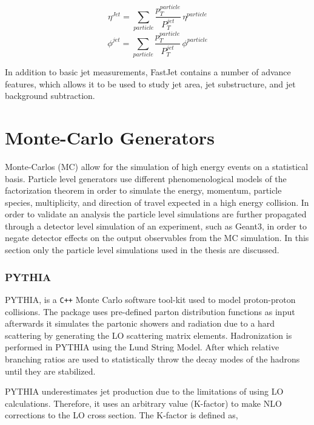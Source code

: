 \begin{equation}
\eta^{Jet} = \sum_{particle} \frac{p_{T}^{particle}}{P_{T}^{jet}} \, \eta^{particle}
\label{eq:JetEtaRecom}
\end{equation}
\begin{equation}
\phi^{jet} = \sum_{particle} \frac{p_{T}^{particle}}{P_{T}^{jet}} \, \phi^{particle}
\label{eq:JetPhiRecom}
\end{equation}

\noindent
In addition to basic jet measurements, FastJet contains a number of advance features, which allows it to be used to study jet area, jet substructure, and jet background subtraction\cite{Connors:2017ptx}.

\section{Monte-Carlo Generators}
Monte-Carlos (MC) allow for the simulation of high energy events on a statistical basis.  Particle level generators use different phenomenological models of the factorization theorem in order to simulate the energy, momentum, particle species, multiplicity, and direction of travel expected in a high energy collision.  In order to validate an analysis the particle level simulations are further propagated through a detector level simulation of an experiment, such as Geant3\cite{Brun:1119728}, in order to negate detector effects on the output observables from the MC simulation.  In this section only the particle level simulations used in the thesis are discussed.

\subsubsection{PYTHIA}

PYTHIA\cite{Sjostrand:2007gs}, is a \verb|C++| Monte Carlo software tool-kit used to model proton-proton collisions.  The package uses pre-defined parton distribution functions as input afterwards it simulates the partonic showers and radiation due to a hard scattering by generating the LO scattering matrix elements.  Hadronization is performed in PYTHIA using the Lund String Model.  After which relative branching ratios are used to statistically throw the decay modes of the hadrons until they are stabilized.

PYTHIA underestimates jet production due to the limitations of using LO calculations.  Therefore, it uses an arbitrary value (K-factor) to make NLO corrections to the LO cross section.  The K-factor is defined as,

